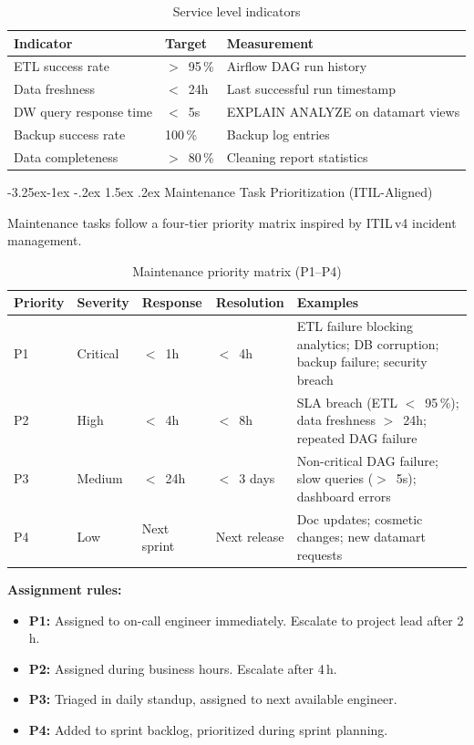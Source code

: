 \documentclass[a4paper,11pt,oneside,openany]{report}
\makeatletter
\renewcommand\subsection{\@startsection{subsection}{2}{\z@}%
  {-3.25ex\@plus -1ex \@minus -.2ex}%
  {1.5ex \@plus .2ex}%
  {\normalfont\large\bfseries\color{ntdarkgreen}}}
\makeatother
\begin{document}
\begin{table}[H]
\centering
\caption{Service level indicators}
\label{tab:sla}
\begin{tabularx}{\textwidth}{L{4cm} C{2cm} L{6.5cm}}
\toprule
\textbf{Indicator} & \textbf{Target} & \textbf{Measurement} \\
\midrule
ETL success rate & $>$~95\,\% & Airflow DAG run history \\
Data freshness & $<$~24h & Last successful run timestamp \\
DW query response time & $<$~5s & EXPLAIN ANALYZE on datamart views \\
Backup success rate & 100\,\% & Backup log entries \\
Data completeness & $>$~80\,\% & Cleaning report statistics \\
\bottomrule
\end{tabularx}
\end{table}

\subsection{Maintenance Task Prioritization (ITIL-Aligned)}

Maintenance tasks follow a four-tier priority matrix inspired by
ITIL\,v4 incident management.

\begin{table}[H]
\centering
\caption{Maintenance priority matrix (P1--P4)}
\label{tab:priority-matrix}
\begin{tabularx}{\textwidth}{C{1.2cm} C{1.5cm} C{1.8cm} C{2cm} L{5cm}}
\toprule
\textbf{Priority} & \textbf{Severity} & \textbf{Response} & \textbf{Resolution} & \textbf{Examples} \\
\midrule
P1 & Critical & $<$~1h & $<$~4h & ETL failure blocking analytics; DB corruption; backup failure; security breach \\
P2 & High & $<$~4h & $<$~8h & SLA breach (ETL $<$~95\,\%); data freshness $>$~24h; repeated DAG failure \\
P3 & Medium & $<$~24h & $<$~3 days & Non-critical DAG failure; slow queries ($>$~5s); dashboard errors \\
P4 & Low & Next sprint & Next release & Doc updates; cosmetic changes; new datamart requests \\
\bottomrule
\end{tabularx}
\end{table}

\textbf{Assignment rules:}
\begin{itemize}[nosep]
  \item \textbf{P1:} Assigned to on-call engineer immediately.
        Escalate to project lead after 2\,h.
  \item \textbf{P2:} Assigned during business hours.
        Escalate after 4\,h.
  \item \textbf{P3:} Triaged in daily standup, assigned to next
        available engineer.
  \item \textbf{P4:} Added to sprint backlog, prioritized during
        sprint planning.
\end{itemize}
\end{document}
